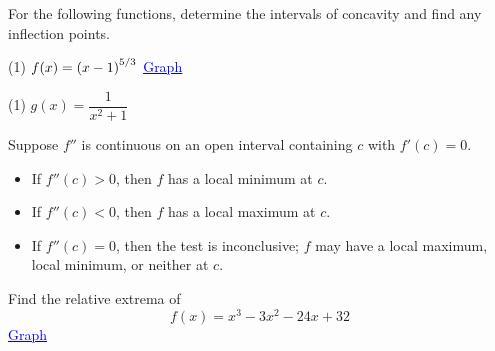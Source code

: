 \documentclass[../mathNotesPreamble]{subfiles}
\begin{document}
  \begin{ex*}
    For the following functions, determine the intervals of concavity and find any inflection points.
  \end{ex*}
  \begin{extasks}[after-item-skip=\stretch{1}](1)
    \task $f(x)={\left(x-1\right)}^{5/3}$ \hfill \href{https://www.desmos.com/calculator/1jpmsat84m}{\textcolor{blue}{\underline{Graph}}}
  \end{extasks}
  \pagebreak

  \begin{extasks}[after-item-skip=\stretch{1}](1)
    \task $g(x)=\dfrac{1}{x^2+1}$
  \end{extasks}
  \pagebreak

  \begin{thmBox*}
    Suppose $f''$ is continuous on an open interval containing $c$ with $f'(c)=0$.
    \begin{itemize}
      \item If $f''(c)>0$, then $f$ has a local minimum at $c$.
      \item If $f''(c)<0$, then $f$ has a local maximum at $c$.
      \item If $f''(c)=0$, then the test is inconclusive; $f$ may have a local maximum, local minimum, or neither at $c$.
    \end{itemize}
  \end{thmBox*}
  \begin{ex*}
    Find the relative extrema of
      \[f(x)=x^3-3x^2-24x+32\]
      \hfill \href{https://www.desmos.com/calculator/re1imdb5c4}{\textcolor{blue}{\underline{Graph}}}
  \end{ex*}
  \pagebreak
\end{document}

